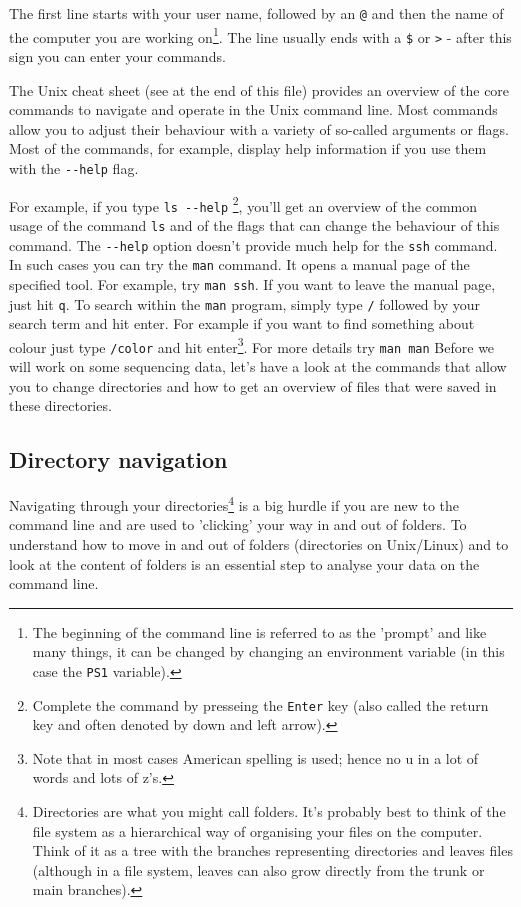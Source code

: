 \documentclass[11pt]{article}
\begin{document}
The first line starts with your user name, followed by an \texttt{@} and then
the name of the computer you are working on\footnote{The beginning of the command line is referred to as the 'prompt' and
like many things, it can be changed by 
changing an environment variable (in this case the \texttt{PS1} variable).}. 
The line usually ends with a
\texttt{\$} or \texttt{>} - after this sign you can enter your commands.

The Unix cheat sheet (see at the end of this file) provides an
overview of the core commands to navigate and operate in the Unix
command line. Most commands allow you to adjust their behaviour with a
variety of so-called arguments or flags. Most of the commands, for
example, display help information if you use them with the \texttt{-{}-help}
flag.

For example, if you type \texttt{ls -{}-help} \footnote{Complete the command by presseing the \texttt{Enter} key (also called the 
return key and often denoted by down and left arrow).}, you'll get an overview of the
common usage of the command \texttt{ls} and of the flags that can change the
behaviour of this command.  The \texttt{-{}-help} option doesn't provide much
help for the \texttt{ssh} command. In such cases you can try the \texttt{man}
command. It opens a manual page of the specified tool. For example,
try \texttt{man ssh}. If you want to leave the manual page, just hit \texttt{q}.
To search within the \texttt{man} program, simply type \texttt{/} followed by your search
term and hit enter. For example if you want to find something about colour
just type \texttt{/color} and hit enter\footnote{Note that in most cases American spelling is used; hence no u in a lot
of words and lots of z's.}. For more details try \texttt{man man}
Before we will work on some sequencing data, let's have a look
at the commands that allow you to change directories and how to get an
overview of files that were saved in these directories.

\subsection{Directory navigation}
\label{sec:orgheadline10}
Navigating through your directories\footnote{Directories are what you might call folders. It's probably best to
think of the file system as a hierarchical way of organising your files on the
computer. Think of it as a tree with the branches representing directories
and leaves files (although in a file system, leaves can also
grow directly from the trunk or main branches).} is a big hurdle if you are new to
the command line and are used to 'clicking' your way in and out of folders. To
understand how to move in and out of folders (directories on Unix/Linux) and to look at the
content of folders is an essential step to analyse your data on
the command line.
\end{document}
